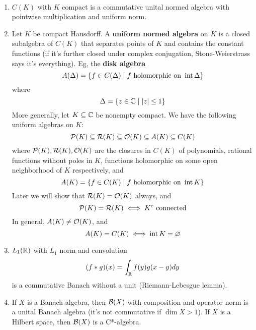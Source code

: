 \documentclass{article}
\begin{document}
\begin{egs*}~
  \begin{enumerate}
    \item $C(K)$ with $K$ compact is a commutative unital normed algebra with pointwise multiplication and uniform norm.
    \item Let $K$ be compact Hausdorff. A {\bf uniform normed algebra} on $K$ is a closed subalgebra of $C(K)$ that separates points of $K$ and contains the constant functions (if it's further closed under complex conjugation, Stone-Weierstrass says it's everything).
    Eg, the {\bf disk algebra}
    $$A(\Delta) = \{f \in C(\Delta) \mid f \text{ holomorphic on } \operatorname{int} \Delta\}$$
    where
    $$\Delta = \{z \in \mathbb C \mid \left\lvert z\right\rvert \le 1\}$$
    More generally, let $K \subseteq \mathbb C$ be nonempty compact. We have the following uniform algebras on $K$:
    $$\mathcal P(K) \subseteq \mathcal R(K) \subseteq \mathcal O(K) \subseteq A(K) \subseteq C(K)$$
    where $\mathcal P(K), \mathcal R(K), \mathcal O(K)$ are the closures in $C(K)$ of polynomials, rational functions without poles in $K$, functions holomorphic on some open neighborhood of $K$ respectively, and
    $$A(K) = \{f \in C(K) \mid f \text{ holomorphic on } \operatorname{int} K\}$$
    Later we will show that $\mathcal R(K) = \mathcal O(K)$ always, and
    $$\mathcal P(K) = \mathcal R(K) \iff K^c \text{ connected}$$
    In general, $A(K) \ne \mathcal O(K)$, and
    $$A(K) = C(K) \iff \operatorname{int} K = \varnothing$$
    \item $L_1(\mathbb R)$ with $L_1$ norm and convolution
    $$(f * g)(x) = \int_\mathbb R f(y)g(x - y) dy$$
    is a commutative Banach without a unit (Riemann-Lebesgue lemma).
    \item If $X$ is a Banach algebra, then $\mathcal B(X)$ with composition and operator norm is a unital Banach algebra (it's not commutative if $\dim X > 1$). If $X$ is a Hilbert space, then $\mathcal B(X)$ is a C*-algebra.
  \end{enumerate}
\end{egs*}
\end{document}
